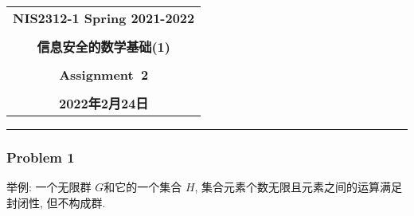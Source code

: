 \documentclass[a4paper,12pt]{ctexart}
\begin{document}
  \begin{center}

  \vspace{-0.3in}
  \begin{tabular}{c}
    \textbf{\Large NIS2312-1 Spring 2021-2022} \\
    \textbf{\Large  } \\
    \textbf{\Large  信息安全的数学基础(1)} \\
    \textbf{\Large  } \\
    \textbf{\Large  Assignment~2} \\
    \textbf{\Large  } \\
    \textbf{\Large 2022年2月24日} \\
  \end{tabular}
  \end{center}
  \noindent
  \rule{\linewidth}{0.4pt}
  
\subsubsection*{Problem 1}
    举例: 一个无限群 $ G $和它的一个集合 $ H $, 集合元素个数无限且元素之间的运算满足封闭性, 但不构成群.
\end{document}
